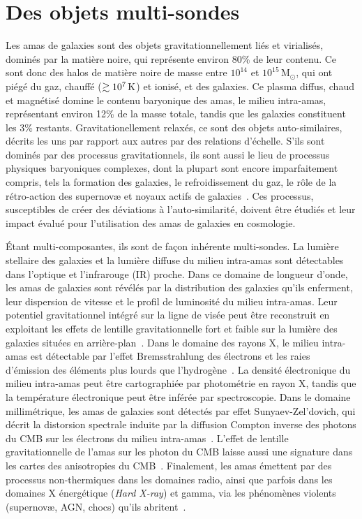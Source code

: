 \section{Des objets multi-sondes}
\label{se:multisondes}

Les amas de galaxies sont des objets gravitationnellement liés et
virialisés, dominés par la matière noire, qui représente environ 80\%
de leur contenu. Ce sont donc des halos de matière noire de
masse entre $10^{14}$ et $10^{15}$\,M$_{\odot}$, qui ont piégé du gaz,
chauffé ($\gtrsim 10^{7}\,\rm{K}$) et ionisé, et des galaxies. Ce
plasma diffus, chaud et magnétisé domine
le contenu baryonique des amas, le milieu
intra-amas, représentant environ 12\% de la masse totale, tandis que
les galaxies constituent les 3\% restants. Gravitationellement
relaxés, ce sont des objets auto-similaires, décrits les uns par
rapport aux autres par des relations d'échelle. S'ils sont dominés par
des processus gravitationnels, ils sont aussi le lieu de processus
physiques baryoniques complexes, dont la plupart sont encore
imparfaitement compris, tels la formation des galaxies, le
refroidissement du gaz, le rôle de la rétro-action des supernovæ et
noyaux actifs de galaxies~\citep[voir par exemple][]{Voit2005}. Ces
processus, susceptibles de créer des déviations à l'auto-similarité,
doivent être étudiés et leur impact évalué pour l'utilisation
des amas de galaxies en cosmologie. 

\'Etant multi-composantes, ils sont de façon inhérente multi-sondes.
La lumière stellaire des galaxies et la lumière diffuse du
milieu intra-amas sont détectables dans l'optique et l'infrarouge (IR)
proche. Dans ce domaine de longueur d'onde, les amas de galaxies sont
révélés par la distribution des galaxies qu'ils enferment, leur
dispersion de vitesse et le profil de luminosité du milieu
intra-amas. Leur potentiel gravitationnel intégré sur la ligne de
visée peut être reconstruit en exploitant les effets de lentille
gravitationnelle fort et faible sur la lumière des galaxies situées en
arrière-plan~\citep[ pour une revue]{Bartelmann2010}. Dans le domaine des
rayons X, le milieu intra-amas est détectable par l'effet Bremsstrahlung des
électrons et les raies d'émission des éléments plus lourds que
l'hydrogène~\citep{Sarazin1986}. La densité électronique du milieu intra-amas peut être
cartographiée par photométrie en rayon X, tandis que la température
électronique peut être inférée par spectroscopie. Dans le domaine
millimétrique, les amas de galaxies sont détectés par effet
Sunyaev-Zel'dovich, qui décrit la distorsion spectrale induite par la
diffusion Compton inverse des photons du CMB sur les électrons du milieu
intra-amas~\citep{SZ1970}.
L'effet de lentille gravitationnelle de l'amas sur les photon du CMB
laisse aussi une signature dans les cartes des anisotropies du
CMB~\citep{Seljak2000}. Finalement, les amas émettent par des
processus non-thermiques dans les domaines radio, ainsi que parfois
dans les domaines X énergétique (\emph{Hard X-ray}) et gamma, via les
phénomènes violents (supernovæ, AGN, chocs) qu'ils
abritent~\citep{Rephaeli2008}.

